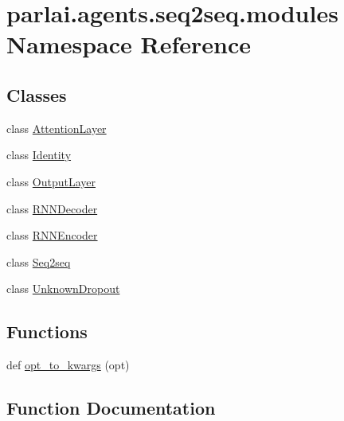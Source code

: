 \hypertarget{namespaceparlai_1_1agents_1_1seq2seq_1_1modules}{}\section{parlai.\+agents.\+seq2seq.\+modules Namespace Reference}
\label{namespaceparlai_1_1agents_1_1seq2seq_1_1modules}
\subsection*{Classes}
\begin{DoxyCompactItemize}
\item 
class \hyperlink{classparlai_1_1agents_1_1seq2seq_1_1modules_1_1AttentionLayer}{Attention\+Layer}
\item 
class \hyperlink{classparlai_1_1agents_1_1seq2seq_1_1modules_1_1Identity}{Identity}
\item 
class \hyperlink{classparlai_1_1agents_1_1seq2seq_1_1modules_1_1OutputLayer}{Output\+Layer}
\item 
class \hyperlink{classparlai_1_1agents_1_1seq2seq_1_1modules_1_1RNNDecoder}{R\+N\+N\+Decoder}
\item 
class \hyperlink{classparlai_1_1agents_1_1seq2seq_1_1modules_1_1RNNEncoder}{R\+N\+N\+Encoder}
\item 
class \hyperlink{classparlai_1_1agents_1_1seq2seq_1_1modules_1_1Seq2seq}{Seq2seq}
\item 
class \hyperlink{classparlai_1_1agents_1_1seq2seq_1_1modules_1_1UnknownDropout}{Unknown\+Dropout}
\end{DoxyCompactItemize}
\subsection*{Functions}
\begin{DoxyCompactItemize}
\item 
def \hyperlink{namespaceparlai_1_1agents_1_1seq2seq_1_1modules_a1ae0eb3090a7701670b5144e47ad2850}{opt\+\_\+to\+\_\+kwargs} (opt)
\end{DoxyCompactItemize}


\subsection{Function Documentation}
\mbox{\label{namespaceparlai_1_1agents_1_1seq2seq_1_1modules_a1ae0eb3090a7701670b5144e47ad2850}} 
